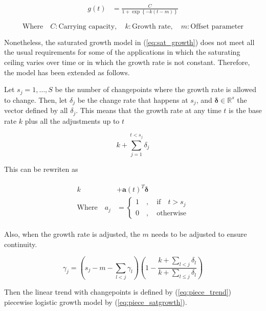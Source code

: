 \begin{align}\label{eq:sat_growth}
		g(t) &= \frac{C}{1 + \exp\left\{ -k(t-m) \right\}}
\end{align}

\begin{equation*}
	\text{Where} \quad
	C: \text{Carrying capacity}, \quad
	k: \text{Growth rate}, \quad
	m: \text{Offset parameter}
\end{equation*}

Nonetheless, the saturated growth model in (\ref{eq:sat_growth}) does not meet all the usual requirements for some of the applications in which the saturating ceiling varies over time or in which the growth rate is not constant. Therefore, the model has been extended as follows.

Let $s_j=1,\ldots,S$ be the number of changepoints where the growth rate is allowed to change. Then, let $\delta_j$ be the change rate that happens at $s_j$, and $\bm{\delta} \in \mathbb{R}^s$ the vector defined by all $\delta_j$. This means that the growth rate at any time $t$ is the base rate $k$ plus all the adjustments up to $t$

\begin{equation}
	k + \sum_{j=1}^{t < s_j}{\delta_j}
\end{equation}

This can be rewriten as

\begin{align}
	\begin{split}
		k &+ \bm{a}(t)^T\bm{\delta} \\
		\text{Where}\quad a_j &= 
		\begin{cases*}
			1\quad,\quad\text{if} \quad t > s_j \\
			0\quad,\quad\text{otherwise}
		\end{cases*}
	\end{split}
\end{align}

Also, when the growth rate is adjusted, the $m$ needs to be adjusted to ensure continuity. 

\begin{equation}
	\gamma_j = \left( s_j - m - \sum_{l<j}{\gamma_l} \right) \left(1 - \frac{k+\sum_{l<j}{\delta_l}}{k+\sum_{l \leq j}{\delta_l}} \right)
\end{equation}

Then the linear trend with changepoints is defined by (\ref{eq:piece_trend}) piecewise logistic growth model by (\ref{eq:piece_satgrowth})\cite{fb_prophet}.

